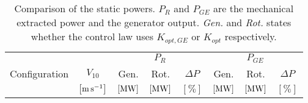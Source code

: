 \documentclass[11pt, a4paper]{article}
\begin{document}
\begin{table}[htb]
  \centering
  \caption{Comparison of the static powers. $P_R$ and $P_{GE}$ are the mechanical extracted power and the generator output. \textit{Gen.} and \textit{Rot.} states whether the control law uses $K_{opt,GE}$ or $K_{opt}$ respectively.}
  \begin{tabular}{cc|ccc|ccc}
    \toprule
    & & \multicolumn{3}{c|}{$P_R$} & \multicolumn{3}{c}{$P_{GE}$} \\
    Configuration & $V_{10}$ & Gen.  & Rot.& $\Delta P$  & Gen.  & Rot.& $\Delta P$ \\ 
    & $\left[\si{\meter\per\second}\right]$ & $\left[\si{\mega\watt}\right]$ & $\left[\si{\mega\watt}\right]$ & $\left[\%\right]$ & $\left[\si{\mega\watt}\right]$ & $\left[\si{\mega\watt}\right]$ & $\left[\%\right]$ \\  \midrule
     
     
  \end{tabular}
\end{table}
\end{document}
